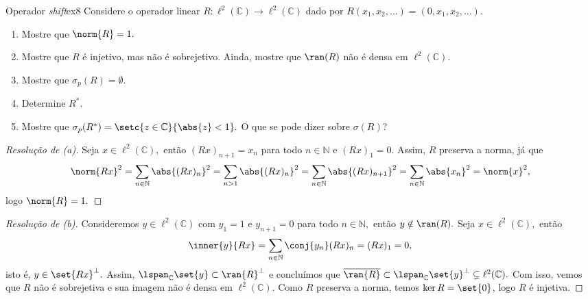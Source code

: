 \begin{exercício}{Operador \emph{shift}}{ex8}
    Considere o operador linear \(R : \ell^2(\mathbb{C}) \to \ell^2(\mathbb{C})\) dado por \(R(x_1, x_2, \dots) = (0, x_1, x_2, \dots).\)
    \begin{enumerate}[label=(\alph*)]
      \item Mostre que \(\norm{R} = 1.\)
      \item Mostre que \(R\) é injetivo, mas não é sobrejetivo. Ainda, mostre que \(\ran(R)\) não é densa em \(\ell^2(\mathbb{C}).\)
      \item Mostre que \(\sigma_p(R) = \emptyset\).
      \item Determine \(R^*.\)
      \item Mostre que \(\sigma_p(R^*) = \setc{z \in \mathbb{C}}{\abs{z} < 1}.\) O que se pode dizer sobre \(\sigma(R)\)?
    \end{enumerate}
\end{exercício}
\begin{proof}[Resolução de (a)]
  Seja \(x \in \ell^2(\mathbb{C}),\) então \((Rx)_{n+1} = x_n\) para todo \(n \in \mathbb{N}\) e \((Rx)_1 = 0.\) Assim, \(R\) preserva a norma, já que
  \begin{equation*}
    \norm{Rx}^2 = \sum_{n \in \mathbb{N}}{\abs{(Rx)_n}^2} = \sum_{n > 1}{\abs{(Rx)_n}^2}= \sum_{n \in \mathbb{N}}{\abs{(Rx)_{n+1}}^2} = \sum_{n \in \mathbb{N}}{\abs{x_n}^2} = \norm{x}^2,
  \end{equation*}
  logo \(\norm{R} = 1.\)
\end{proof}
\begin{proof}[Resolução de (b)]
  Consideremos \(y \in \ell^2(\mathbb{C})\) com \(y_1 = 1\) e \(y_{n+1} = 0\) para todo \(n \in \mathbb{N},\) então \(y \notin \ran(R).\) Seja \(x \in \ell^2(\mathbb{C}),\) então
  \begin{equation*}
    \inner{y}{Rx} = \sum_{n \in \mathbb{N}}{\conj{y_n} (Rx)_n} = (Rx)_1 = 0,
  \end{equation*}
  isto é, \(y \in \set{Rx}^\perp.\) Assim, \(\lspan_{\mathbb{C}}\set{y} \subset \ran{R}^\perp\) e concluímos que \(\closure{\ran{R}} \subset \lspan_{\mathbb{C}}{\set{y}}^\perp \subsetneq \ell^2(\mathbb{C}).\) Com isso, vemos que \(R\) não é sobrejetiva e sua imagem não é densa em \(\ell^2(\mathbb{C}).\) Como \(R\) preserva a norma, temos \(\ker{R}= \set{0}\), logo \(R\) é injetiva.
\end{proof}
